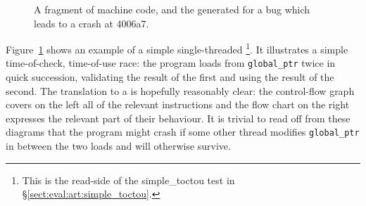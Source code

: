 \begin{figure}
\begin{subfloat}
\begin{minipage}{30mm}
    \end{minipage}
    \caption{\STateMachine}
  \end{subfloat}
  \label{fig:intro:single_threaded_machine}
  \caption{A fragment of machine code, and the \StateMachine generated
    for a bug which leads to a crash at 4006a7.}
\end{figure}

Figure~\ref{fig:intro:single_threaded_machine} shows an example of a
simple single-threaded \StateMachine\footnote{This is the read-side of
  the simple\_toctou test in \S\ref{sect:eval:art:simple_toctou}.}.
It illustrates a simple time-of-check, time-of-use race: the program
loads from \verb|global_ptr| twice in quick succession, validating the
result of the first and using the result of the second.  The
translation to a \StateMachine is hopefully reasonably clear: the
control-flow graph covers on the left all of the relevant instructions
and the flow chart on the right expresses the relevant part of their
behaviour.  It is trivial to read off from these diagrams that the
program might crash if some other thread modifies \verb|global_ptr| in
between the two loads and will otherwise survive.

